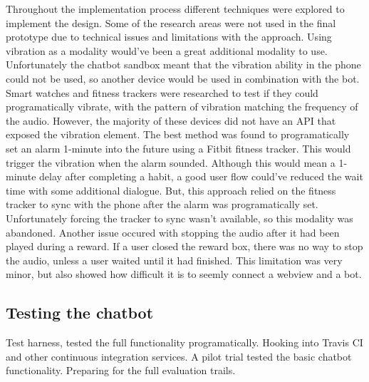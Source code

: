 Throughout the implementation process different techniques were explored to implement the design.
Some of the research areas were not used in the final prototype due to technical issues and limitations with the approach.\newline
\newline
Using vibration as a modality would've been a great additional modality to use.
Unfortunately the chatbot sandbox meant that the vibration ability in the phone could not be used, so another device would be used in combination with the bot.
Smart watches and fitness trackers were researched to test if they could programatically vibrate, with the pattern of vibration matching the frequency of the audio.
However, the majority of these devices did not have an API that exposed the vibration element. The best method was found to programatically set an alarm 1-minute into the future using a Fitbit fitness tracker.
This would trigger the vibration when the alarm sounded.
Although this would mean a 1-minute delay after completing a habit, a good user flow could've reduced the wait time with some additional dialogue.
But, this approach relied on the fitness tracker to sync with the phone after the alarm was programatically set. Unfortunately forcing the tracker to sync wasn't available, so this modality was abandoned.\newline
\newline
Another issue occured with stopping the audio after it had been played during a reward. If a user closed the reward box, there was no way to stop the audio, unless a user waited until it had finished. This limitation was very minor, but also showed how difficult it is to seemly connect a webview and a bot.


\subsection{Testing the chatbot}

Test harness, tested the full functionality programatically. Hooking into Travis CI and other continuous integration services.
A pilot trial tested the basic chatbot functionality. Preparing for the full evaluation trails.

\newpage